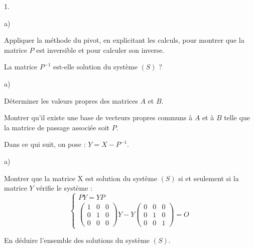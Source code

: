\documentclass[11pt]{article}%
\begin{document}
\begin{noliste}{1.}
 \setlength{\itemsep}{4mm}
\item 

\begin{noliste}{a)}
 \setlength{\itemsep}{2mm}
\item Appliquer la méthode du pivot, en explicitant les calculs, pour
montrer que la matrice $P$ est inversible et pour calculer son inverse.

\item La matrice $P^{-1}$ est-elle solution du système $(S)$ ?
\end{noliste}

\item 

\begin{noliste}{a)}
 \setlength{\itemsep}{2mm}
\item Déterminer les valeurs propres des matrices $A$ et $B$.

\item Montrer qu'il existe une base de vecteurs propres communs à $A$
et à $B
$ telle que la matrice de passage associée soit $P$.
\end{noliste}

\item Dans ce qui suit, on pose : $Y = X-P^{-1}$.

\begin{noliste}{a)}
 \setlength{\itemsep}{2mm}
\item Montrer que la matrice X est solution du système $(S)$ si et
seulement
si la matrice $Y$ vérifie le système :
\[
\left\{ 
\begin{array}{c}
PY = YP \\
\left( 
\begin{array}{rrr}
1 & 0 & 0 \\
0 & 1 & 0 \\
0 & 0 & 0
\end{array}
\right) Y-Y\left( 
\begin{array}{rrr}
0 & 0 & 0 \\
0 & 1 & 0 \\
0 & 0 & 1
\end{array}
\right) = O
\end{array}
\right. 
\]

\item En déduire l'ensemble des solutions du système $(S)$.
\end{noliste}
\end{noliste}
\end{document}
